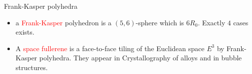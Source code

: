 \documentclass[%
pdf,
colorBG,
slideColor,
]{prosper}
\begin{document}
\begin{slide}{Frank-Kasper polyhedra}
\begin{itemize}
\item a \textcolor{red}{Frank-Kasper} polyhedron is a $(5,6)$-sphere which is $6R_0$. Exactly $4$ cases exists.
\item A \textcolor{red}{space fullerene} is a face-to-face tiling of the Euclidean space $E^3$ by Frank-Kasper polyhedra. They appear in Crystallography of alloys and in bubble structures.
\end{itemize}

\begin{center}
\begin{minipage}{4.5cm}
\begin{minipage}{20mm}
\centering
\epsfxsize=17mm
\par
\end{minipage}
\hfill\begin{minipage}{20mm}
\centering
\epsfxsize=20mm
\par
\end{minipage}
\begin{minipage}{20mm}
\centering
\epsfxsize=20mm
\par
\end{minipage}
\hfill\begin{minipage}{20mm}
\centering
\epsfxsize=20mm
\par
\end{minipage}
\end{minipage}
\begin{minipage}{4.5cm}
\centering
{}\par
\end{minipage}
\end{center}

\end{slide}
\end{document}
